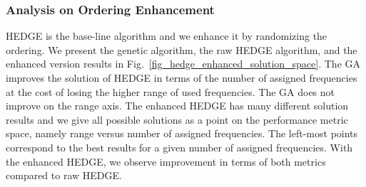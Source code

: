 \documentclass[10pt,twocolumn,twoside]{JCNtran}
\newcommand{\tbirkan}[1]{#1}
\begin{document}
\subsubsection{Analysis on Ordering Enhancement}
\label{subsec_effect_of_bf}
HEDGE is the base-line algorithm and we enhance it by randomizing the ordering. We present the genetic algorithm, the raw HEDGE algorithm, and the enhanced version results in Fig.~\ref{fig_hedge_enhanced_solution_space}. The GA improves the solution of HEDGE in terms of the number of assigned frequencies at the cost of losing the higher range of used frequencies. The GA does not improve on the range axis. The enhanced HEDGE has many different solution results and we give all possible solutions as a point on the performance metric space, namely range versus number of assigned frequencies. The left-most points correspond to the best results for a given number of assigned frequencies. With the enhanced HEDGE, we observe improvement in terms of both metrics \tbirkan{compared to raw HEDGE}.
\end{document}

